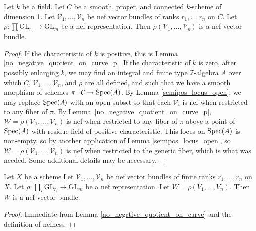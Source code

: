 \begin{lemma}\label{no_negative_quotient_on_curve}
Let $k$ be a field.
Let $C$ be a smooth, proper, and connected $k$-scheme of dimension 1.
Let $\mathcal{V}_1,\ldots,\mathcal{V}_n$ be nef vector bundles of
ranks $r_1,\ldots,r_n$ on $C$.
Let $\rho : \prod \mathrm{GL}_{r_i} \to \mathrm{GL}_m$ be a nef
representation.
Then $\rho(\mathcal{V}_1,\ldots,\mathcal{V}_n)$ is a nef vector bundle.
\end{lemma}
\begin{proof}
If the characteristic of $k$ is positive, this is Lemma
\ref{no_negative_quotient_on_curve_p}.
If the characteristic of $k$ is zero, after possibly enlarging $k$, we may find
an integral and finite type $\mathbb{Z}$-algebra $A$ over which $C$,
$\mathcal{V}_1,\ldots,\mathcal{V}_n$, and $\rho$ are all defined, and such that
we have a smooth morphism of schemes $\pi : \mathcal{C} \to \mathop{\rm Spec}(A)$.
By Lemma \ref{semipos_locus_open}, we may replace $\mathop{\rm Spec}(A)$ with an open
subset so that each $\mathcal{V}_i$ is nef when restricted to any
fiber of $\pi$.
By Lemma~\ref{no_negative_quotient_on_curve_p},
$\mathcal{W} = \rho(\mathcal{V}_1,\ldots,\mathcal{V}_n)$ is nef when
restricted to any fiber of $\pi$ above a point of $\mathop{\rm Spec}(A)$ with residue field
of positive characteristic.
This locus on $\mathop{\rm Spec}(A)$ is non-empty, so by another application of Lemma
\ref{semipos_locus_open}, so
$\mathcal{W} = \rho(\mathcal{V}_1,\ldots,\mathcal{V}_n)$ is nef when
restricted to the generic fiber, which is what was needed.
Some additional details may be necessary.
\end{proof}


\begin{lemma}\label{apply_rho_still_semipos}
Let $X$ be a scheme
Let $\mathcal{V}_1,\ldots,\mathcal{V}_n$ be nef vector bundles of
finite ranks $r_1,\ldots,r_n$ on $X$.
Let $\rho:\prod_i \mathrm{GL}_{r_i} \to \mathrm{GL}_m$ be a nef
representation.
Let $W = \rho(V_1,\ldots,V_n)$.
Then $W$ is a nef vector bundle.
\end{lemma}

\begin{proof}
Immediate from Lemma \ref{no_negative_quotient_on_curve} and the definition of
nefness.
\end{proof}


